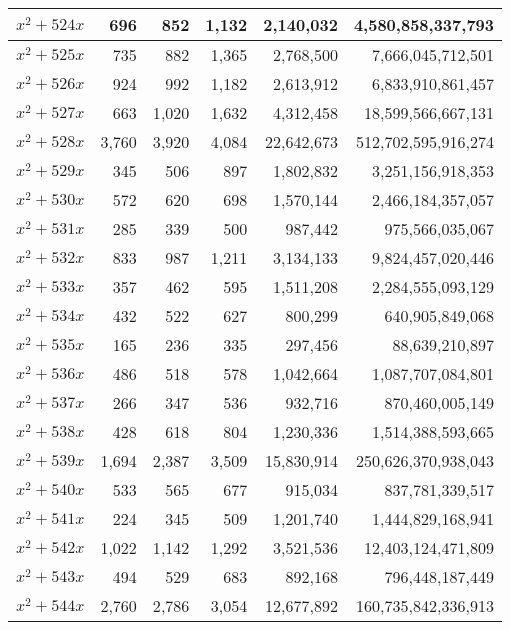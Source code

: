 \documentclass[a4paper]{amsproc}
\theoremstyle{plain}
\begin{document}
\begin{longtable}{ | l | r | r | r | r | r | }
$x^2 + 524x$ & 696 & 852 & 1{,}132 & 2{,}140{,}032 & 4{,}580{,}858{,}337{,}793 \\ \hline
$x^2 + 525x$ & 735 & 882 & 1{,}365 & 2{,}768{,}500 & 7{,}666{,}045{,}712{,}501 \\ \hline
$x^2 + 526x$ & 924 & 992 & 1{,}182 & 2{,}613{,}912 & 6{,}833{,}910{,}861{,}457 \\ \hline
$x^2 + 527x$ & 663 & 1{,}020 & 1{,}632 & 4{,}312{,}458 & 18{,}599{,}566{,}667{,}131 \\ \hline
$x^2 + 528x$ & 3{,}760 & 3{,}920 & 4{,}084 & 22{,}642{,}673 & 512{,}702{,}595{,}916{,}274 \\ \hline
$x^2 + 529x$ & 345 & 506 & 897 & 1{,}802{,}832 & 3{,}251{,}156{,}918{,}353 \\ \hline
$x^2 + 530x$ & 572 & 620 & 698 & 1{,}570{,}144 & 2{,}466{,}184{,}357{,}057 \\ \hline
$x^2 + 531x$ & 285 & 339 & 500 & 987{,}442 & 975{,}566{,}035{,}067 \\ \hline
$x^2 + 532x$ & 833 & 987 & 1{,}211 & 3{,}134{,}133 & 9{,}824{,}457{,}020{,}446 \\ \hline
$x^2 + 533x$ & 357 & 462 & 595 & 1{,}511{,}208 & 2{,}284{,}555{,}093{,}129 \\ \hline
$x^2 + 534x$ & 432 & 522 & 627 & 800{,}299 & 640{,}905{,}849{,}068 \\ \hline
$x^2 + 535x$ & 165 & 236 & 335 & 297{,}456 & 88{,}639{,}210{,}897 \\ \hline
$x^2 + 536x$ & 486 & 518 & 578 & 1{,}042{,}664 & 1{,}087{,}707{,}084{,}801 \\ \hline
$x^2 + 537x$ & 266 & 347 & 536 & 932{,}716 & 870{,}460{,}005{,}149 \\ \hline
$x^2 + 538x$ & 428 & 618 & 804 & 1{,}230{,}336 & 1{,}514{,}388{,}593{,}665 \\ \hline
$x^2 + 539x$ & 1{,}694 & 2{,}387 & 3{,}509 & 15{,}830{,}914 & 250{,}626{,}370{,}938{,}043 \\ \hline
$x^2 + 540x$ & 533 & 565 & 677 & 915{,}034 & 837{,}781{,}339{,}517 \\ \hline
$x^2 + 541x$ & 224 & 345 & 509 & 1{,}201{,}740 & 1{,}444{,}829{,}168{,}941 \\ \hline
$x^2 + 542x$ & 1{,}022 & 1{,}142 & 1{,}292 & 3{,}521{,}536 & 12{,}403{,}124{,}471{,}809 \\ \hline
$x^2 + 543x$ & 494 & 529 & 683 & 892{,}168 & 796{,}448{,}187{,}449 \\ \hline
$x^2 + 544x$ & 2{,}760 & 2{,}786 & 3{,}054 & 12{,}677{,}892 & 160{,}735{,}842{,}336{,}913 \\ \hline

\end{longtable}
\end{document}
